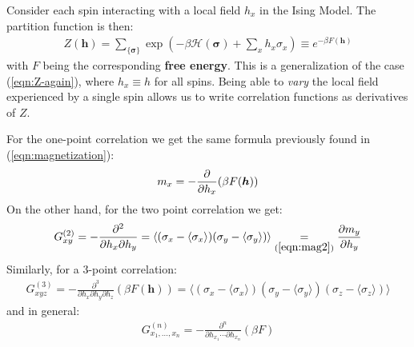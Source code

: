 \documentclass[../../main.tex]{subfiles}
\begin{document}
\medskip

Consider each spin interacting with a local field $h_x$ in the Ising Model. The partition function is then:
\begin{align*}
    Z(\bm{h}) = \sum_{\{\bm{\sigma}\}} \exp\left(-\beta \mathcal{H}(\bm{\sigma}) + \sum_x h_x \sigma_x \right) \equiv e^{-\beta F(\bm{h})}
\end{align*}
with $F$ being the corresponding \textbf{free energy}. This is a generalization of the case (\ref{eqn:Z-again}), where $h_x \equiv h$ for all spins. Being able to \textit{vary} the local field experienced by a single spin allows us to write correlation functions as derivatives of $Z$. 

\medskip

For the one-point correlation we get the same formula previously found in (\ref{eqn:magnetization}):
\begin{align}\label{eqn:mag2}
    m_x = -\pdv{h_x} (\beta F(\bm{h}))
\end{align}
On the other hand, for the two point correlation we get:
\begin{align}\label{eqn:G2}
    G_{xy}^{(2)} = -\pdv[2]{}{h_x}{h_y} (\beta F(\bm{h})) = \langle (\sigma_x - \langle \sigma_x \rangle) (\sigma_y - \langle \sigma_y \rangle)\rangle \underset{(\ref{eqn:mag2})}{=}  \pdv{m_y}{h_y}
\end{align}
Similarly, for a $3$-point correlation:
\begin{align*}
    G_{xyz}^{(3)} = -\frac{\partial^3}{\partial h_x \partial h_y \partial h_z} (\beta F(\bm{h})) = \langle (\sigma_x - \langle \sigma_x \rangle) (\sigma_y - \langle \sigma_y \rangle) (\sigma_z - \langle \sigma_z \rangle) \rangle 
\end{align*}
and in general:
\begin{align*}
    G_{x_1,\dots,x_n}^{(n)} = - \frac{\partial^n}{\partial h_{x_1}\cdots \partial h_{x_n}}  (\beta F)
\end{align*}
\end{document}
